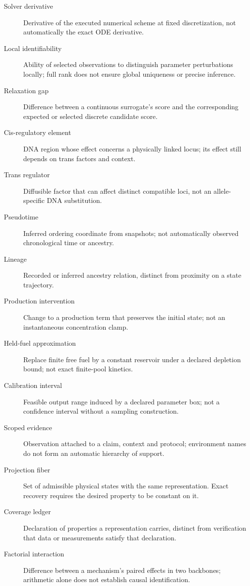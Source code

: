 \begin{description}
\item[Solver derivative] Derivative of the executed numerical scheme at fixed discretization, not automatically the exact ODE derivative.
\item[Local identifiability] Ability of selected observations to distinguish parameter perturbations locally; full rank does not ensure global uniqueness or precise inference.
\item[Relaxation gap] Difference between a continuous surrogate's score and the corresponding expected or selected discrete candidate score.
\item[Cis-regulatory element] DNA region whose effect concerns a physically linked locus; its effect still depends on trans factors and context.
\item[Trans regulator] Diffusible factor that can affect distinct compatible loci, not an allele-specific DNA substitution.
\item[Pseudotime] Inferred ordering coordinate from snapshots; not automatically observed chronological time or ancestry.
\item[Lineage] Recorded or inferred ancestry relation, distinct from proximity on a state trajectory.
\item[Production intervention] Change to a production term that preserves the initial state; not an instantaneous concentration clamp.
\item[Held-fuel approximation] Replace finite free fuel by a constant reservoir
under a declared depletion bound; not exact finite-pool kinetics.
\item[Calibration interval] Feasible output range induced by a declared parameter
box; not a confidence interval without a sampling construction.
\item[Scoped evidence] Observation attached to a claim, context and protocol;
environment names do not form an automatic hierarchy of support.
\item[Projection fiber] Set of admissible physical states with the same
representation. Exact recovery requires the desired property to be constant on it.
\item[Coverage ledger] Declaration of properties a representation carries,
distinct from verification that data or measurements satisfy that declaration.
\item[Factorial interaction] Difference between a mechanism's paired effects
in two backbones; arithmetic alone does not establish causal identification.
\end{description}
